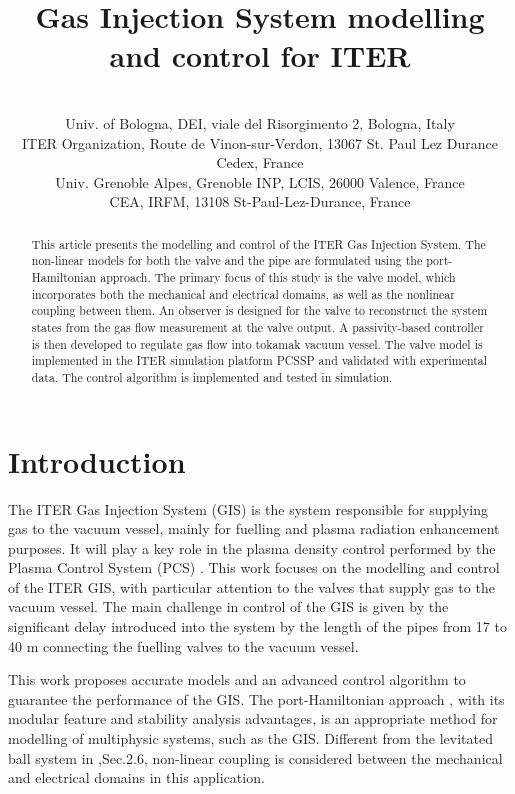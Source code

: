 \documentclass[letterpaper, 10pt, conference]{ieeeconf}
\date{}
\title{Gas Injection System modelling and control for ITER}
\author{\authorblockN{Dante Piotto\authorrefmark{1},
                        Anna Trang Vu\authorrefmark{2},
                        Luca Zabeo\authorrefmark{2}, 
                        Laurent Lef\`evre\authorrefmark{3}, 
                        Alessandro Macchelli\authorrefmark{1}, \\
                        Thomas Keenan\authorrefmark{2}, 
                        Remy Nouailletas\authorrefmark{4},
                        Timo Ravensbergen\authorrefmark{2},                          
                        Peter De Vries\authorrefmark{2},                        
                        David Weldon\authorrefmark{4}}\\
	\authorrefmark{1} Univ.  of Bologna, DEI, viale del Risorgimento 2, Bologna, Italy\\ %
	\authorrefmark{2} ITER Organization, Route de Vinon-sur-Verdon, 13067 St. Paul Lez Durance Cedex, France \\%
	\authorrefmark{3} Univ. Grenoble Alpes, Grenoble INP, LCIS, 26000 Valence, France \\ %
    \authorrefmark{4} CEA, IRFM, 13108 St-Paul-Lez-Durance, France %
    }
\begin{document}
\maketitle
\thispagestyle{empty}
\pagestyle{empty}

\begin{abstract}

This article presents the modelling and control of the ITER Gas Injection System. The non-linear models for both the valve and the pipe are formulated using the port-Hamiltonian approach. The primary focus of this study is the valve model, which incorporates both the mechanical and electrical domains, as well as the nonlinear coupling between them. An observer is designed for the valve to reconstruct the system states from the gas flow measurement at the valve output. A passivity-based controller is then developed to regulate gas flow into tokamak vacuum vessel. The valve model is implemented in the ITER simulation platform PCSSP and validated with experimental data. The control algorithm is implemented and tested in simulation.

\end{abstract}
\section{Introduction}
The ITER Gas Injection System (GIS)\cite{GIS_2012} is the system responsible for supplying gas to the vacuum vessel, mainly for fuelling and plasma radiation enhancement purposes. It will play a key role in the plasma density control performed by the Plasma Control System (PCS) \cite{deVries2024}. This work focuses on the modelling and control of the ITER GIS, with particular attention to the valves that supply gas to the vacuum vessel. The main challenge in control of the GIS is given by the significant delay introduced into the system by the length of the pipes from 17 to 40 m connecting the fuelling valves to the vacuum vessel.

This work proposes accurate models and an advanced control algorithm to guarantee the performance of the GIS. 
The port-Hamiltonian approach \cite{maschke1993port,schaft2020}, with its modular feature and stability analysis advantages, is an appropriate method for modelling of multiphysic systems, such as the GIS. Different from the levitated ball system in \cite{schaft2020},Sec.2.6, non-linear coupling is considered between the mechanical and electrical domains in this application.
\end{document}
